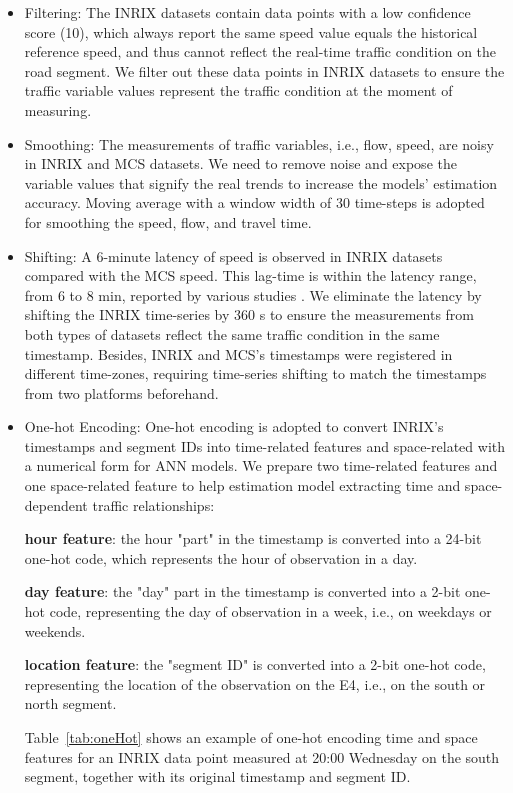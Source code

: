 \documentclass[english]{kththesis}
\begin{document}
\begin{itemize}
    \item Filtering: The INRIX datasets contain data points with a low confidence score (10), which always report the same speed value equals the historical reference speed, and thus cannot reflect the real-time traffic condition on the road segment. We filter out these data points in INRIX datasets to ensure the traffic variable values represent the traffic condition at the moment of measuring.
    \item Smoothing: The measurements of traffic variables, i.e., flow, speed, are noisy in INRIX and MCS datasets. We need to remove noise and expose the variable values that signify the real trends to increase the models' estimation accuracy. Moving average with a window width of 30 time-steps is adopted for smoothing the speed, flow, and travel time.
    \item Shifting: A 6-minute latency of speed is observed in INRIX datasets compared with the MCS speed. This lag-time is within the latency range, from 6 to 8 min, reported by various studies \cite{kim_inrix_data_comparing}. We eliminate the latency by shifting the INRIX time-series by 360 s to ensure the measurements from both types of datasets reflect the same traffic condition in the same timestamp. Besides, INRIX and MCS's timestamps were registered in different time-zones, requiring time-series shifting to match the timestamps from two platforms beforehand.
    \item One-hot Encoding: One-hot encoding \cite{geron_handson_ml} is adopted to convert INRIX's timestamps and segment IDs into time-related features and space-related with a numerical form for ANN models. We prepare two time-related features and one space-related feature to help estimation model extracting time and space-dependent traffic relationships:
    
    \textbf{hour feature}: the hour "part" in the timestamp is converted into a 24-bit one-hot code, which represents the hour of observation in a day.
    
    \textbf{day feature}: the "day" part in the timestamp is converted into a 2-bit one-hot code, representing the day of observation in a week, i.e., on weekdays or weekends.
    
    \textbf{location feature}: the "segment ID" is converted into a 2-bit one-hot code, representing the location of the observation on the E4, i.e., on the south or north segment.
    
    Table~\ref{tab:oneHot} shows an example of one-hot encoding time and space features for an INRIX data point measured at 20:00 Wednesday on the south segment, together with its original timestamp and segment ID.


\end{itemize}
\end{document}
